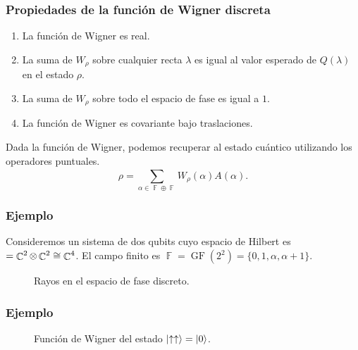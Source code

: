 \documentclass[10pt, spanish]{beamer}
\DeclareMathOperator{\C}{\mathbb{C}}
\DeclareMathOperator{\F}{\mathbb{F}}
\let\H\relax
\DeclareMathOperator{\H}{\mathcal H}
\DeclareMathOperator{\GF}{GF}
\begin{document}
  \begin{frame}
    \frametitle{Propiedades de la función de Wigner
    discreta}

    \begin{enumerate}
      \item La función de Wigner es real.
      \item La suma de $W_\rho$ sobre cualquier recta
        $\lambda$ es igual al valor esperado de $Q(\lambda)$
        en el estado $\rho$.
      \item La suma de $W_\rho$ sobre todo el espacio de
        fase es igual a $1$.
      \item La función de Wigner es covariante bajo
        traslaciones.
    \end{enumerate}

    \vspace{10pt}

    Dada la función de Wigner, podemos recuperar al estado
    cuántico utilizando los operadores puntuales.
    \begin{equation}
      \rho
      = \sum_{\alpha \in \F \oplus \F}^{}
      W_\rho(\alpha) A(\alpha).
    \end{equation}
  \end{frame}

  \begin{frame}
    \frametitle{Ejemplo}

    Consideremos un sistema de dos qubits cuyo espacio de
    Hilbert es $\H = \C^2 \otimes \C^2 \cong \C^{4}$. El
    campo finito es $\F = \GF(2^2) =
    \{0,1,\alpha,\alpha+1\}$.
    \begin{figure}[h]
      \centering
      \scalebox{0.4}{
        
      }
      \caption{Rayos en el espacio de fase discreto.}
      \label{fig:affine-desargues-2-2}
    \end{figure}
  \end{frame}

  \begin{frame}
    \frametitle{Ejemplo}

    \begin{figure}[h]
      \centering
      \scalebox{0.6}{
        
      }
      \caption{Función de Wigner del estado
      $\ket{\uparrow\uparrow} = \ket{0}$.}
      \label{fig:wigner-desargues-2-2-s1}
    \end{figure}
  \end{frame}
\end{document}
